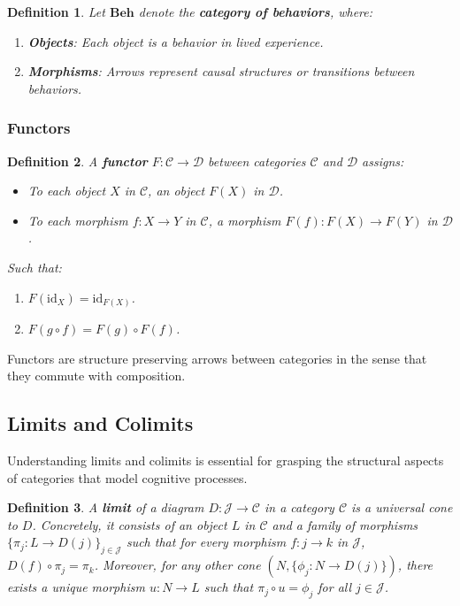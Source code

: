 \documentclass{article}
\newtheorem{definition}{Definition}[section]
\begin{document}
\begin{definition}
    Let $\mathbf{Beh}$ denote the \textbf{category of behaviors}, where:
    \begin{enumerate}
        \item \textbf{Objects}: Each object is a behavior in lived experience.
        \item \textbf{Morphisms}: Arrows represent causal structures or transitions between behaviors.
    \end{enumerate}
\end{definition}


\subsubsection{Functors}

\begin{definition} A \textbf{functor} $F \colon \mathcal{C} \to \mathcal{D}$ between categories $\mathcal{C}$ and $\mathcal{D}$ assigns:

    \begin{itemize} \item To each object $X$ in $\mathcal{C}$, an object $F(X)$ in $\mathcal{D}$. \item To each morphism $f \colon X \to Y$ in $\mathcal{C}$, a morphism $F(f) \colon F(X) \to F(Y)$ in $\mathcal{D}$. \end{itemize}

    Such that:

    \begin{enumerate} \item $F(\text{id}_X) = \text{id}_{F(X)}$. \item $F(g \circ f) = F(g) \circ F(f)$. \end{enumerate} \end{definition}

Functors are structure preserving arrows between categories in the sense that they commute with composition.

\subsection{Limits and Colimits}

Understanding limits and colimits is essential for grasping the structural aspects of categories that model cognitive processes.

\begin{definition}
    A \textbf{limit} of a diagram $D \colon \mathcal{J} \to \mathcal{C}$ in a category $\mathcal{C}$ is a universal cone to $D$. Concretely, it consists of an object $L$ in $\mathcal{C}$ and a family of morphisms $\{\pi_j \colon L \to D(j)\}_{j \in \mathcal{J}}$ such that for every morphism $f \colon j \to k$ in $\mathcal{J}$, $D(f) \circ \pi_j = \pi_k$. Moreover, for any other cone $(N, \{\phi_j \colon N \to D(j)\})$, there exists a unique morphism $u \colon N \to L$ such that $\pi_j \circ u = \phi_j$ for all $j \in \mathcal{J}$.
\end{definition}
\end{document}
